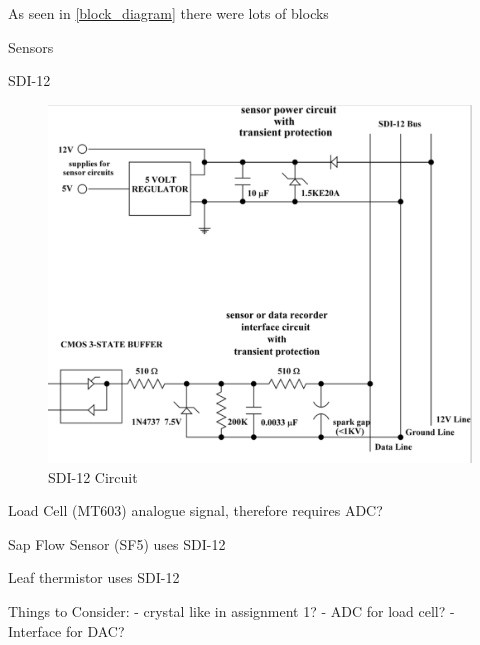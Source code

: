 As seen in \cref{block_diagram} there were lots of blocks


Sensors

SDI-12

\begin{figure}
    \includegraphics[width=\linewidth]{SDI-12 circuit.png}
    \caption{SDI-12 Circuit}
    \label{sdi12_circuit}
\end{figure}

Load Cell (MT603)
analogue signal, therefore requires ADC?

Sap Flow Sensor (SF5)
uses SDI-12

Leaf thermistor
uses SDI-12

Things to Consider:
- crystal like in assignment 1?
- ADC for load cell?
- Interface for DAC?